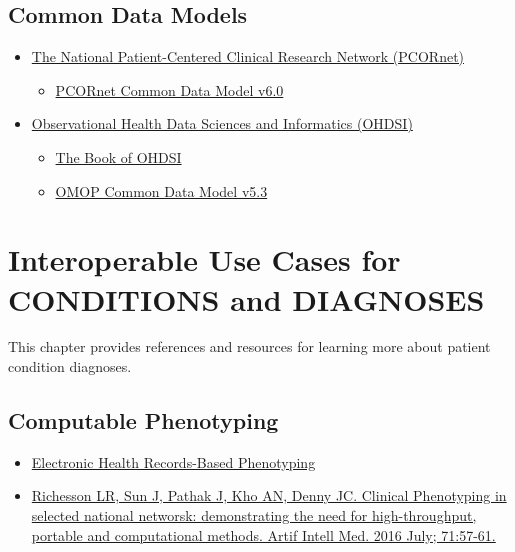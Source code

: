 \documentclass[
]{journal}
\providecommand{\tightlist}{%
  \setlength{\itemsep}{0pt}\setlength{\parskip}{0pt}}
\begin{document}
\hypertarget{common-data-models}{%
\subsection{Common Data Models}\label{common-data-models}}

\begin{itemize}
\item
  \href{https://pcornet.org/}{The National Patient-Centered Clinical Research Network (PCORnet)}

  \begin{itemize}
  \tightlist
  \item
    \href{https://pcornet.org/wp-content/uploads/2022/01/PCORnet-Common-Data-Model-v60-2020_10_221.pdf}{PCORnet Common Data Model v6.0}
  \end{itemize}
\item
  \href{https://www.ohdsi.org/}{Observational Health Data Sciences and Informatics (OHDSI)}

  \begin{itemize}
  \tightlist
  \item
    \href{https://ohdsi.github.io/TheBookOfOhdsi/}{The Book of OHDSI}
  \item
    \href{https://ohdsi.github.io/CommonDataModel/cdm53.html}{OMOP Common Data Model v5.3}
  \end{itemize}
\end{itemize}

\hypertarget{interoperable-use-cases-for-conditions-and-diagnoses}{%
\section{Interoperable Use Cases for CONDITIONS and DIAGNOSES}\label{interoperable-use-cases-for-conditions-and-diagnoses}}

This chapter provides references and resources for learning more about patient condition diagnoses.

\hypertarget{computable-phenotyping}{%
\subsection{Computable Phenotyping}\label{computable-phenotyping}}

\begin{itemize}
\tightlist
\item
  \href{https://rethinkingclinicaltrials.org/chapters/conduct/electronic-health-records-based-phenotyping/electronic-health-records-based-phenotyping-introduction/}{Electronic Health Records-Based Phenotyping}
\item
  \href{https://www.sciencedirect.com/science/article/pii/S0933365716300641?via\%3Dihub}{Richesson LR, Sun J, Pathak J, Kho AN, Denny JC. Clinical Phenotyping in selected national networsk: demonstrating the need for high-throughput, portable and computational methods. Artif Intell Med. 2016 July; 71:57-61.}
\end{itemize}
\end{document}
